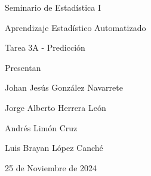 \begin{titlepage}
	\centering
	\vspace*{0.5cm}
	\HRule{1.5pt}
	{\Huge Seminario de Estadística I\par}
	{\Huge Aprendizaje Estadístico Automatizado\par}
	\HRule{1.5pt}
	\vspace*{0.5cm}
	
	{\LARGE Tarea 3A - Predicción}\\
	
	\vfill
	{\Large Presentan\par}
	{\Large Johan Jesús González Navarrete\par}
	{\Large Jorge Alberto Herrera León\par}
	{\Large Andrés Limón Cruz\par}
	{\Large Luis Brayan López Canché\par}
	\vspace*{1cm}
	{\large 25 de Noviembre de 2024\par}
\end{titlepage}